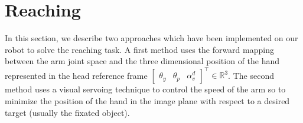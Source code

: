 \section{Reaching}
\label{sec:reaching}

In this section, we describe two approaches which have been 
implemented on our robot to solve the reaching task. A first method 
uses the forward mapping between the arm joint space and the three 
dimensional position of the hand represented in the head reference 
frame $\begin{bmatrix} \theta_y & \theta_p & \alpha_v^d\end{bmatrix}^\top 
\in \mathbb R^3$. 
The second method uses a visual servoing technique to control the 
speed of the arm so to minimize the position of the hand in the 
image plane with respect to a desired target (usually the fixated object).

